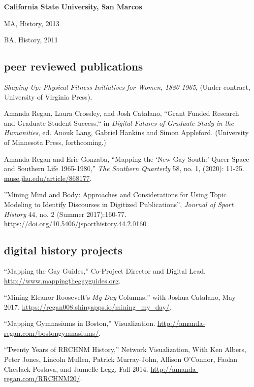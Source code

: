 \documentclass[11pt]{article}
\begin{document}
\vspace{0.05in}

\textbf{California State University, San Marcos}

\hfill\begin{minipage}{6.25in}
MA, History, 2013

\vspace{0.10in}
BA, History, 2011


\end{minipage}


\subsection{peer reviewed publications}\label{peer-reviewed}

\emph{Shaping Up: Physical Fitness Initiatives for Women, 1880-1965}, (Under contract, University of Virginia Press).

Amanda Regan, Laura Crossley, and Josh Catalano, ``Grant Funded Research and Graduate Student Success,`` in \emph{Digital Futures of Graduate Study in the Humanities}, ed. Anouk Lang, Gabriel Hankins and Simon Appleford. (University of Minnesota Press, forthcoming.)

Amanda Regan and Eric Gonzaba, ``Mapping the `New Gay South:' Queer Space and Southern Life 1965-1980,'' \emph{The Southern Quarterly} 58, no. 1, (2020): 11-25. \url{muse.jhu.edu/article/868177}.

''Mining Mind and Body: Approaches and Considerations for Using Topic Modeling to Identify Discourses in Digitized Publications'', \emph{Journal of Sport History} 44, no. 2 (Summer 2017):160-77. \url{https://doi.org/10.5406/jsporthistory.44.2.0160}

\subsection{digital history projects}
``Mapping the Gay Guides,'' Co-Project Director and Digital Lead. \url{http://www.mappingthegayguides.org}.

``Mining Eleanor Roosevelt's \emph{My Day} Columns,'' with Joshua Catalano, May 2017. \url{https://regan008.shinyapps.io/mining_my_day/}.

``Mapping Gymnasiums in Boston,'' Visualization. \url{http://amanda-regan.com/bostongymnasiums/}.

``Twenty Years of RRCHNM History,'' Network Visualization, With Ken Albers, Peter Jones, Lincoln Mullen, Patrick Murray-John, Allison O’Connor, Faolan Cheslack-Postava, and Jannelle Legg, Fall 2014. \url{http://amanda-regan.com/RRCHNM20/}.
\end{document}
